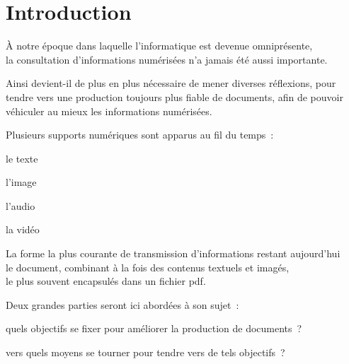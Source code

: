 \section{Introduction}

À notre époque dans laquelle l’informatique est devenue omniprésente,\\
la consultation d’informations numérisées n’a jamais été aussi importante.

Ainsi devient-il de plus en plus nécessaire de mener diverses réflexions,
pour tendre vers une production toujours plus fiable de documents,
afin de pouvoir véhiculer au mieux les informations numérisées.

Plusieurs supports numériques sont apparus au fil du temps :
\begin{itmz}
\item{le texte}
\item{l’image}
\item{l’audio}
\item{la vidéo}
\end{itmz}
La forme la plus courante de transmission d’informations restant aujourd’hui\\
le document, combinant à la fois des contenus textuels et imagés,\\
le plus souvent encapsulés dans un fichier \gls{pdf}.

Deux grandes parties seront ici abordées à son sujet :
\begin{enum}
\item{quels objectifs se fixer pour améliorer la production de documents ?}
\item{vers quels moyens se tourner pour tendre vers de tels objectifs ?}
\end{enum}

\pagebreak

